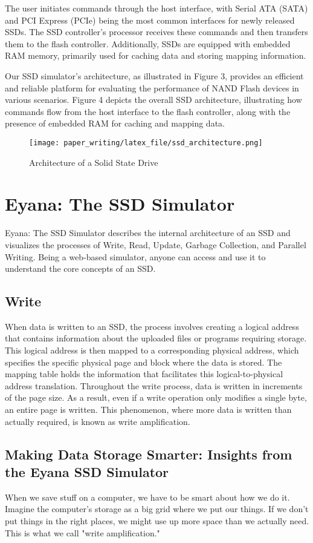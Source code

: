 \documentclass[conference]{/home/habib/Desktop/flash_ssd_simulator_web/paper_writing/latex_file/IEEEtran}
\begin{document}
The user initiates commands through the host interface, with Serial ATA (SATA) and PCI Express (PCIe) being the most common interfaces for newly released SSDs. The SSD controller's processor receives these commands and then transfers them to the flash controller. Additionally, SSDs are equipped with embedded RAM memory, primarily used for caching data and storing mapping information.

Our SSD simulator's architecture, as illustrated in Figure 3, provides an efficient and reliable platform for evaluating the performance of NAND Flash devices in various scenarios. Figure 4 depicts the overall SSD architecture, illustrating how commands flow from the host interface to the flash controller, along with the presence of embedded RAM for caching and mapping data.

\begin{figure}[h]
    \centering
    \texttt{[image: paper\_writing/latex\_file/ssd\_architecture.png]}
    \caption{Architecture of a Solid State Drive}
    \label{fig:ssd_architecture}
\end{figure}

\section{Eyana: The SSD Simulator}
Eyana: The SSD Simulator describes the internal architecture of an SSD and visualizes the processes of Write, Read, Update, Garbage Collection, and Parallel Writing. Being a web-based simulator, anyone can access and use it to understand the core concepts of an SSD.

\subsection{Write}
When data is written to an SSD, the process involves creating a logical address that contains information about the uploaded files or programs requiring storage. This logical address is then mapped to a corresponding physical address, which specifies the specific physical page and block where the data is stored. The mapping table holds the information that facilitates this logical-to-physical address translation.
Throughout the write process, data is written in increments of the page size. As a result, even if a write operation only modifies a single byte, an entire page is written. This phenomenon, where more data is written than actually required, is known as write amplification.
\subsection{Making Data Storage Smarter: Insights from the Eyana SSD Simulator}
When we save stuff on a computer, we have to be smart about how we do it. Imagine the computer's storage as a big grid where we put our things. If we don't put things in the right places, we might use up more space than we actually need. This is what we call "write amplification."
\end{document}
